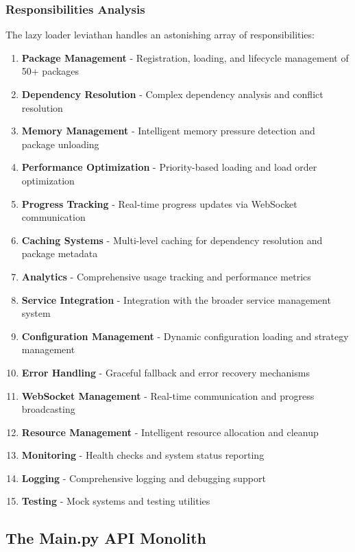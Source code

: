 \documentclass[11pt]{article}
\begin{document}
\subsubsection{Responsibilities Analysis}

The lazy loader leviathan handles an astonishing array of responsibilities:

\begin{enumerate}
\item \textbf{Package Management} - Registration, loading, and lifecycle management of 50+ packages
\item \textbf{Dependency Resolution} - Complex dependency analysis and conflict resolution
\item \textbf{Memory Management} - Intelligent memory pressure detection and package unloading
\item \textbf{Performance Optimization} - Priority-based loading and load order optimization
\item \textbf{Progress Tracking} - Real-time progress updates via WebSocket communication
\item \textbf{Caching Systems} - Multi-level caching for dependency resolution and package metadata
\item \textbf{Analytics} - Comprehensive usage tracking and performance metrics
\item \textbf{Service Integration} - Integration with the broader service management system
\item \textbf{Configuration Management} - Dynamic configuration loading and strategy management
\item \textbf{Error Handling} - Graceful fallback and error recovery mechanisms
\item \textbf{WebSocket Management} - Real-time communication and progress broadcasting
\item \textbf{Resource Management} - Intelligent resource allocation and cleanup
\item \textbf{Monitoring} - Health checks and system status reporting
\item \textbf{Logging} - Comprehensive logging and debugging support
\item \textbf{Testing} - Mock systems and testing utilities
\end{enumerate}

\subsection{The Main.py API Monolith}
\end{document}
